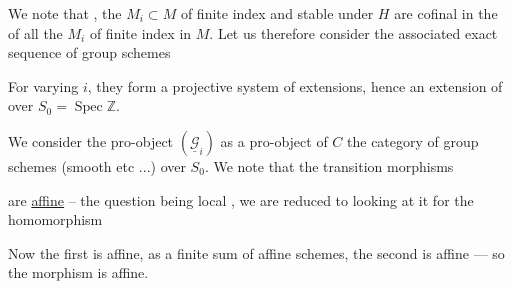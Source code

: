 

We note that ,
 the $M_i\subset M$ of finite index and stable under $H$
are cofinal in the  of all the $M_i$ of finite index in
$M$. Let us therefore consider the associated exact sequence of group schemes



For varying $i$, they form a projective system of extensions,
hence an extension of  over $S_0=\operatorname{Spec}\mathbb Z$.



We consider the pro-object $(\underline{\mathcal G}_i)$ as a pro-object
of $C$ the category of group schemes (smooth etc ...) over $S_0$.
We note that the transition morphisms


are \uline{affine} -- the question being local
, we are reduced to looking at it for
the homomorphism





Now the first is affine, as a finite sum of affine schemes, the second is affine --- so the morphism is affine.

